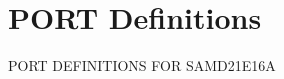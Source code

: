 \hypertarget{group___s_a_m_d21_e16_a__port}{}\section{P\+O\+RT Definitions}
\label{group___s_a_m_d21_e16_a__port}
P\+O\+RT D\+E\+F\+I\+N\+I\+T\+I\+O\+NS F\+OR S\+A\+M\+D21\+E16A 